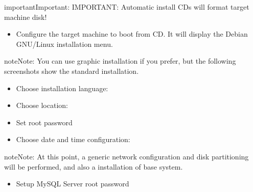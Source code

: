 \documentclass[letterpaper,10pt,english]{sphinxmanual}
\begin{document}
\begin{notice}{important}{Important:}
IMPORTANT: Automatic install CDs will format target machine disk!
\end{notice}
\begin{itemize}
\item {} 
Configure the target machine to boot from CD. It will display the Debian
GNU/Linux installation menu.

\end{itemize}

\begin{notice}{note}{Note:}
You can use graphic installation if you prefer, but the following
screenshots show the standard installation.
\end{notice}

\noindent{}
\begin{itemize}
\item {} 
Choose installation language:

\end{itemize}

\noindent{}
\begin{itemize}
\item {} 
Choose location:

\end{itemize}

\noindent{}
\begin{itemize}
\item {} 
Set root password

\end{itemize}

\noindent{}
\begin{itemize}
\item {} 
Choose date and time configuration:

\end{itemize}

\noindent{}

\begin{notice}{note}{Note:}
At this point, a generic network configuration and disk partitioning
will be performed, and also a installation of base system.
\end{notice}
\begin{itemize}
\item {} 
Setup MySQL Server root password

\end{itemize}
\end{document}
